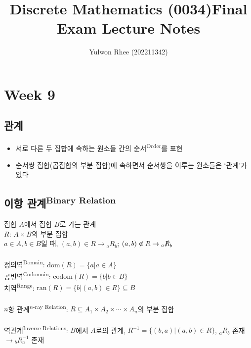 



\title{Discrete Mathematics (0034)\newline\space Final Exam Lecture Notes}
\author{Yulwon Rhee (202211342)}

\maketitle
\setcounter{section}{8}
\section{Week 9}
\subsection{관계}
\begin{itemize}
    \item 서로 다른 두 집합에 속하는 원소들 간의 순서\textsuperscript{Order}를 표현
    \item 순서쌍 집합(곱집합의 부분 집합)에 속하면서 순서쌍을 이루는 원소들은 `관계'가 있다
\end{itemize}

\subsection{이항 관계\textsuperscript{Binary Relation}}
집합 $A$에서 집합 $B$로 가는 관계\\
$R$: $A \times B$의 부분 집합\\
$a \in A, b \in B$일 때, $(a, b) \in R \to {_aR_b}$; $(a, b) \not\in R \to {_a\slashed{R}_b}$
\\\\
정의역\textsuperscript{Domain}: $\mathrm{dom}(R) = \{a | a \in A\}$\\
공변역\textsuperscript{Codomain}: $\mathrm{codom}(R) = \{b | b \in B\}$\\
치역\textsuperscript{Range}: $\mathrm{ran}(R) = \{b | (a, b) \in R\} \subseteq B$
\\\\
$n$항 관계\textsuperscript{$n$-ray Relation}: $R \subseteq A_1 \times A_2 \times \cdots \times A_n$의 부분 집합
\\\\
역관계\textsuperscript{Inverse Relations}: $B$에서 $A$로의 관계, $R^{-1} = \{(b, a) | (a, b) \in R\}$, $_aR_b$ 존재 $\to {_bR^{-1}_a}$ 존재

